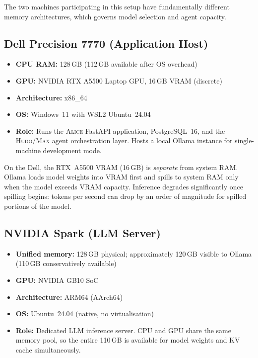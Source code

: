 The two machines participating in this setup have fundamentally different
memory architectures, which governs model selection and agent capacity.

\subsection{Dell Precision 7770 (Application Host)}

\begin{itemize}
  \item \textbf{CPU RAM:} 128\,GB (112\,GB available after OS overhead)
  \item \textbf{GPU:} NVIDIA RTX A5500 Laptop GPU, 16\,GB VRAM (discrete)
  \item \textbf{Architecture:} x86\_64
  \item \textbf{OS:} Windows~11 with WSL2 Ubuntu~24.04
  \item \textbf{Role:} Runs the \textsc{Alice} FastAPI application,
        PostgreSQL~16, and the \textsc{Hudo}/\textsc{Max} agent
        orchestration layer. Hosts a local Ollama instance for
        single-machine development mode.
\end{itemize}

On the Dell, the RTX~A5500 VRAM (16\,GB) is \emph{separate} from system
RAM. Ollama loads model weights into VRAM first and spills to system RAM
only when the model exceeds VRAM capacity. Inference degrades
significantly once spilling begins: tokens per second can drop by an
order of magnitude for spilled portions of the model.

\subsection{NVIDIA Spark (LLM Server)}

\begin{itemize}
  \item \textbf{Unified memory:} 128\,GB physical; approximately 120\,GB
        visible to Ollama (110\,GB conservatively available)
  \item \textbf{GPU:} NVIDIA GB10 SoC
  \item \textbf{Architecture:} ARM64 (AArch64)
  \item \textbf{OS:} Ubuntu~24.04 (native, no virtualisation)
  \item \textbf{Role:} Dedicated LLM inference server. CPU and GPU share
        the same memory pool, so the entire 110\,GB is available for
        model weights and KV cache simultaneously.
\end{itemize}

